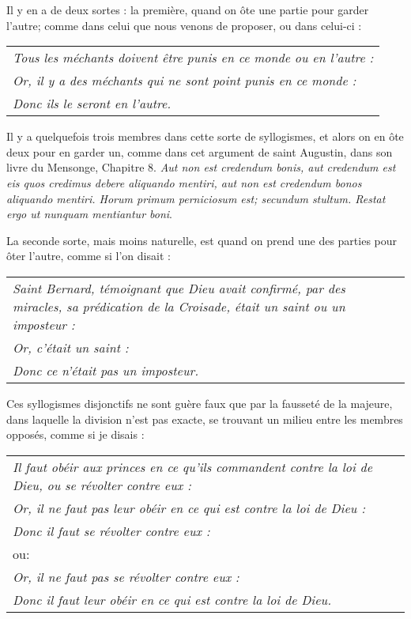 Il y en a de deux sortes : la première, quand on ôte une partie pour garder l'autre; comme dans celui que nous venons de proposer, ou dans celui-ci :

	\begin{tabularx}{\textwidth}{X}
		\emph{Tous les méchants doivent être punis en ce monde ou en l'autre : } \\
		\emph{Or, il y a des méchants qui ne sont point punis en ce monde :} \\
		\emph{Donc ils le seront en l'autre.} \\
	\end{tabularx}

Il y a quelquefois trois membres dans cette sorte de syllogismes, et alors on en ôte deux pour en garder un, comme dans cet argument de saint Augustin, dans son livre du Mensonge, Chapitre 8. \emph{Aut non est credendum bonis, aut credendum est eis quos credimus debere aliquando mentiri, aut non est credendum bonos aliquando mentiri. Horum primum perniciosum est; secundum stultum. Restat ergo ut nunquam mentiantur boni}.

La seconde sorte, mais moins naturelle, est quand on prend une des parties pour ôter l'autre, comme si l'on disait :

	\begin{tabularx}{\textwidth}{X}
		\emph{Saint Bernard, témoignant que Dieu avait confirmé, par des miracles, sa prédication de la Croisade, était un saint ou un imposteur :} \\
		\emph{Or, c'était un saint :} \\
		\emph{Donc ce n'était pas un imposteur.} \\
	\end{tabularx}

Ces syllogismes disjonctifs ne sont guère faux que par la fausseté de la majeure, dans laquelle la division n'est pas exacte, se trouvant un milieu entre les membres opposés, comme si je disais :

	\begin{tabularx}{\textwidth}{X}
		\emph{Il faut obéir aux princes en ce qu'ils commandent contre la loi de Dieu, ou se révolter contre eux :} \\
		\emph{Or, il ne faut pas leur obéir en ce qui est contre la loi de Dieu :} \\
		\emph{Donc il faut se révolter contre eux :} \\
		{\space\space\space\space\space ou:} \\
		\emph{Or, il ne faut pas se révolter contre eux :} \\
		\emph{Donc il faut leur obéir en ce qui est contre la loi de Dieu.} \\
	\end{tabularx}

